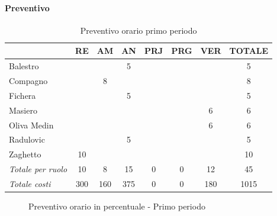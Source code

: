 \documentclass[a4paper,12pt]{article}
\begin{document}
            \paragraph{Preventivo}
                \begin{table}[H]
                \centering
                \begin{tabular}{|l|c|c|c|c|c|c|c|}
                \hline
                    \rowcolor{lightgray}{\textbf{Membro}} & {\textbf{RE}} & {\textbf{AM}} & {\textbf{AN}} & {\textbf{PRJ}} & {\textbf{PRG}} & {\textbf{VER}} & {\textbf{TOTALE}}\\
                \hline
                    Balestro & & & 5 & & & & 5\\
                \hline
                    Compagno & & 8 & & & & & 8\\
                \hline
                    Fichera & & & 5 & & & & 5\\
                \hline
                    Masiero & & & & & & 6 & 6\\
                \hline
                    Oliva Medin & & & & & & 6 & 6\\
                \hline
                    Radulovic & & & 5 & & & & 5\\
                \hline
                    Zaghetto & 10 & & & & & & 10\\
                \hline
                    \rowcolor{lightgray}\textit{Totale per ruolo} & 10 & 8 & 15 & 0 & 0 & 12 & 45\\
                \hline
                    \rowcolor{lightgray}\textit{Totale costi} & 300 & 160 & 375 & 0 & 0 & 180 & 1015\\
                \hline
                \end{tabular}
                \caption{Preventivo orario primo periodo}
                \end{table}

                \begin{figure}[H]
                \centering
                \caption{Preventivo orario in percentuale - Primo periodo}
                \end{figure}
        
\end{document}
